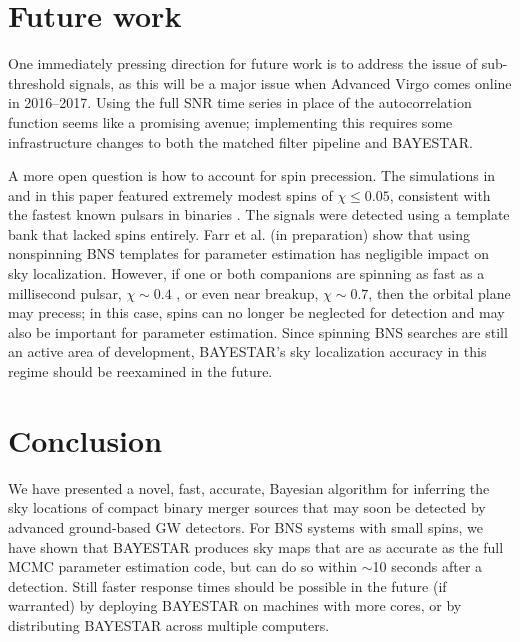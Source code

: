 \documentclass[amsmath,amssymb,aps,prx,reprint,nopreprintnumbers,nofootinbib]{revtex4-1}
\begin{document}
\section{Future work}

One immediately pressing direction for future work is to address the issue of sub\nobreakdashes-threshold signals, as this will be a major issue when Advanced Virgo comes online in 2016\nobreakdashes--2017. Using the full \ac{SNR} time series in place of the autocorrelation function seems like a promising avenue; implementing this requires some infrastructure changes to both the matched filter pipeline and \ac{BAYESTAR}.

A more open question is how to account for spin precession. The simulations in \cite{FirstTwoYears} and in this paper featured extremely modest spins of $\chi \leq 0.05$, consistent with the fastest known pulsars in binaries \citep{2003Natur.426..531B,DetectingBNSSystemsWithSpin}. The signals were detected using a template bank that lacked spins entirely. Farr et al. (in preparation) show that using nonspinning \ac{BNS} templates for parameter estimation has negligible impact on sky localization. However, if one or both companions are spinning as fast as a millisecond pulsar, $\chi \sim 0.4$ \cite{FastestSpinningMillisecondPulsar}, or even near breakup, $\chi \sim 0.7$, then the orbital plane may precess; in this case, spins can no longer be neglected for detection \cite{DetectingBNSSystemsWithSpin} and may also be important for parameter estimation. Since spinning \ac{BNS} searches are still an active area of development, \ac{BAYESTAR}'s sky localization accuracy in this regime should be reexamined in the future.

\section{Conclusion}

We have presented a novel, fast, accurate, Bayesian algorithm for inferring the sky locations of compact binary merger sources that may soon be detected by advanced ground\nobreakdashes-based \ac{GW} detectors. For \ac{BNS} systems with small spins, we have shown that \ac{BAYESTAR} produces sky maps that are as accurate as the full \ac{MCMC} parameter estimation code, but can do so within $\sim$10 seconds after a detection. Still faster response times should be possible in the future (if warranted) by deploying \ac{BAYESTAR} on machines with more cores, or by distributing \ac{BAYESTAR} across multiple computers.
\end{document}
